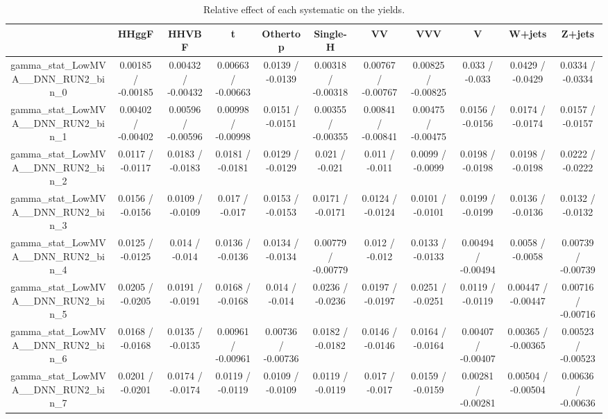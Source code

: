 \documentclass[10pt]{article}
\begin{document}
\begin{table}[htbp]
\begin{center}
\begin{tabular}{|c|c|c|c|c|c|c|c|c|c|c|}
\hline 
      & HHggF      & HHVBF      & t      & Othertop      & Single-H      & VV      & VVV      & V      & W+jets      & Z+jets \\ 
\hline 
  gamma_stat_LowMVA__DNN_RUN2_bin_0 & 0.00185 / -0.00185 & 0.00432 / -0.00432 & 0.00663 / -0.00663 & 0.0139 / -0.0139 & 0.00318 / -0.00318 & 0.00767 / -0.00767 & 0.00825 / -0.00825 & 0.033 / -0.033 & 0.0429 / -0.0429 & 0.0334 / -0.0334 \\ 
  gamma_stat_LowMVA__DNN_RUN2_bin_1 & 0.00402 / -0.00402 & 0.00596 / -0.00596 & 0.00998 / -0.00998 & 0.0151 / -0.0151 & 0.00355 / -0.00355 & 0.00841 / -0.00841 & 0.00475 / -0.00475 & 0.0156 / -0.0156 & 0.0174 / -0.0174 & 0.0157 / -0.0157 \\ 
  gamma_stat_LowMVA__DNN_RUN2_bin_2 & 0.0117 / -0.0117 & 0.0183 / -0.0183 & 0.0181 / -0.0181 & 0.0129 / -0.0129 & 0.021 / -0.021 & 0.011 / -0.011 & 0.0099 / -0.0099 & 0.0198 / -0.0198 & 0.0198 / -0.0198 & 0.0222 / -0.0222 \\ 
  gamma_stat_LowMVA__DNN_RUN2_bin_3 & 0.0156 / -0.0156 & 0.0109 / -0.0109 & 0.017 / -0.017 & 0.0153 / -0.0153 & 0.0171 / -0.0171 & 0.0124 / -0.0124 & 0.0101 / -0.0101 & 0.0199 / -0.0199 & 0.0136 / -0.0136 & 0.0132 / -0.0132 \\ 
  gamma_stat_LowMVA__DNN_RUN2_bin_4 & 0.0125 / -0.0125 & 0.014 / -0.014 & 0.0136 / -0.0136 & 0.0134 / -0.0134 & 0.00779 / -0.00779 & 0.012 / -0.012 & 0.0133 / -0.0133 & 0.00494 / -0.00494 & 0.0058 / -0.0058 & 0.00739 / -0.00739 \\ 
  gamma_stat_LowMVA__DNN_RUN2_bin_5 & 0.0205 / -0.0205 & 0.0191 / -0.0191 & 0.0168 / -0.0168 & 0.014 / -0.014 & 0.0236 / -0.0236 & 0.0197 / -0.0197 & 0.0251 / -0.0251 & 0.0119 / -0.0119 & 0.00447 / -0.00447 & 0.00716 / -0.00716 \\ 
  gamma_stat_LowMVA__DNN_RUN2_bin_6 & 0.0168 / -0.0168 & 0.0135 / -0.0135 & 0.00961 / -0.00961 & 0.00736 / -0.00736 & 0.0182 / -0.0182 & 0.0146 / -0.0146 & 0.0164 / -0.0164 & 0.00407 / -0.00407 & 0.00365 / -0.00365 & 0.00523 / -0.00523 \\ 
  gamma_stat_LowMVA__DNN_RUN2_bin_7 & 0.0201 / -0.0201 & 0.0174 / -0.0174 & 0.0119 / -0.0119 & 0.0109 / -0.0109 & 0.0119 / -0.0119 & 0.017 / -0.017 & 0.0159 / -0.0159 & 0.00281 / -0.00281 & 0.00504 / -0.00504 & 0.00636 / -0.00636 \\ 
\hline 
\end{tabular} 
\caption{Relative effect of each systematic on the yields.} 
\end{center} 
\end{table} 
\end{document}
